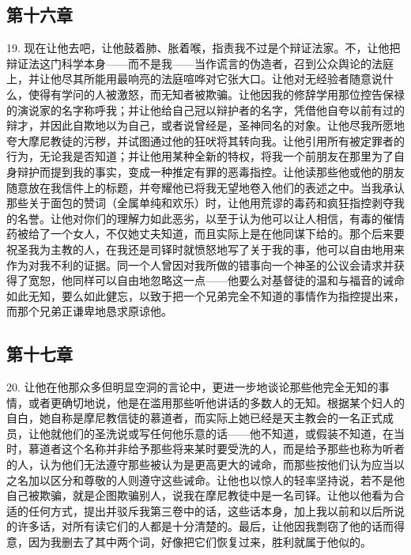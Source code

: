 
\subsection{第十六章}

19. 现在让他去吧，让他鼓着肺、胀着喉，指责我不过是个辩证法家。不，让他把辩证法这门科学本身——而不是我——当作谎言的伪造者，召到公众舆论的法庭上，并让他尽其所能用最响亮的法庭喧哗对它张大口。让他对无经验者随意说什么，使得有学问的人被激怒，而无知者被欺骗。让他因我的修辞学用那位控告保禄的演说家的名字称呼我；并让他给自己冠以辩护者的名字，凭借他自夸以前有过的辩才，并因此自欺地以为自己，或者说曾经是，圣神同名的对象。让他尽我所愿地夸大摩尼教徒的污秽，并试图通过他的狂吠将其转向我。让他引用所有被定罪者的行为，无论我是否知道；并让他用某种全新的特权，将我一个前朋友在那里为了自身辩护而提到我的事实，变成一种推定有罪的恶毒指控。让他读那些他或他的朋友随意放在我信件上的标题，并夸耀他已将我无望地卷入他们的表述之中。当我承认那些关于面包的赞词（全属单纯和欢乐）时，让他用荒谬的毒药和疯狂指控剥夺我的名誉。让他对你们的理解力如此恶劣，以至于认为他可以让人相信，有毒的催情药被给了一个女人，不仅她丈夫知道，而且实际上是在他同谋下给的。那个后来要祝圣我为主教的人，在我还是司铎时就愤怒地写了关于我的事，他可以自由地用来作为对我不利的证据。同一个人曾因对我所做的错事向一个神圣的公议会请求并获得了宽恕，他同样可以自由地忽略这一点——他要么对基督徒的温和与福音的诫命如此无知，要么如此健忘，以致于把一个兄弟完全不知道的事情作为指控提出来，而那个兄弟正谦卑地恳求原谅他。\par


\subsection{第十七章}

20. 让他在他那众多但明显空洞的言论中，更进一步地谈论那些他完全无知的事情，或者更确切地说，他是在滥用那些听他讲话的多数人的无知。根据某个妇人的自白，她自称是摩尼教信徒的慕道者，而实际上她已经是天主教会的一名正式成员，让他就他们的圣洗说或写任何他乐意的话——他不知道，或假装不知道，在当时，慕道者这个名称并非给予那些将来某时要受洗的人，而是给予那些也称为听者的人，认为他们无法遵守那些被认为是更高更大的诫命，而那些按他们认为应当以之名加以区分和尊敬的人则遵守这些诫命。让他也以惊人的轻率坚持说，若不是他自己被欺骗，就是企图欺骗别人，说我在摩尼教徒中是一名司铎。让他以他看为合适的任何方式，提出并驳斥我第三卷中的话，这些话本身，加上我以前和以后所说的许多话，对所有读它们的人都是十分清楚的。最后，让他因我剽窃了他的话而得意，因为我删去了其中两个词，好像把它们恢复过来，胜利就属于他似的。\par

